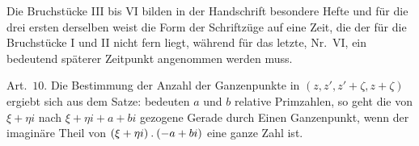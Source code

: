 Die Bruchstücke III bis VI bilden in der Handschrift besondere Hefte und für die drei ersten derselben weist die Form der Schriftzüge auf eine Zeit, die der für die Bruchstücke I und II nicht fern liegt, während für das letzte, Nr.\ VI, ein bedeutend späterer Zeitpunkt angenommen werden muss.

\par\medskip
[I.] Art.\ $10$. Die Bestimmung der Anzahl der Ganzenpunkte in $(z,z',z'+\zeta,z+\zeta)$ ergiebt sich aus dem Satze: bedeuten $a$ und $b$ relative Primzahlen, so geht die von $\xi+\eta i$ nach $\xi+\eta i+a+bi$ gezogene Gerade durch Einen Ganzenpunkt, wenn der imaginäre Theil von $(\xi+\eta i)\mathbin{.}(-a+bi)$ eine ganze Zahl ist.

